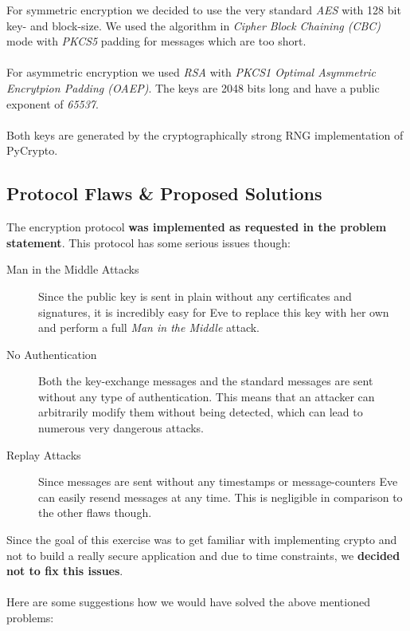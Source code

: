 \documentclass[11pt, a4paper]{article}
\begin{document}
For symmetric encryption we decided to use the very standard \textit{AES} with
128 bit key- and block-size. We used the algorithm in \textit{Cipher Block
	Chaining (CBC)} mode with \textit{PKCS5} padding for messages which are too
short.
\\\\
For asymmetric encryption we used \textit{RSA} with \textit{PKCS1 Optimal
	Asymmetric Encrytpion Padding (OAEP)}. The keys are 2048 bits long and have a
public exponent of \textit{65537}.
\\\\
Both keys are generated by the cryptographically strong RNG implementation of
PyCrypto.

\subsection{Protocol Flaws \& Proposed Solutions}

The encryption protocol \textbf{was implemented as requested in the problem
	statement}. This protocol has some serious issues though:

\begin{description}
	
	\item[Man in the Middle Attacks] Since the public key is sent in plain
	without any certificates and signatures, it is incredibly easy for Eve to
	replace this key with her own and perform a full \textit{Man in the Middle}
	attack.
	
	\item[No Authentication] Both the key-exchange messages and the standard
	messages are sent without any type of authentication. This means that an
	attacker can arbitrarily modify them without being detected, which can
	lead to numerous very dangerous attacks.
	
	\item[Replay Attacks] Since messages are sent without any timestamps or
	message-counters Eve can easily resend messages at any time. This is
	negligible in comparison to the other flaws though.
	
\end{description}

Since the goal of this exercise was to get familiar with implementing crypto
and not to build a really secure application and due to time constraints, we
\textbf{decided not to fix this issues}.
\\\\
Here are some suggestions how we would have solved the above mentioned problems:
\end{document}
